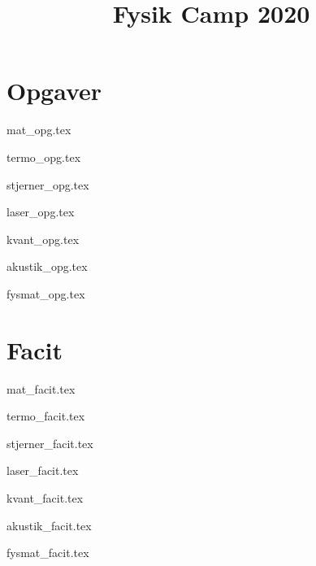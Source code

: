 \documentclass[a4paper]{memoir}
\title{Fysik Camp 2020}
\begin{document}


\newpage
\tableofcontents
\newpage
\mainmatter

\chapter{Opgaver}
{mat_opg.tex}

{termo_opg.tex}

{stjerner_opg.tex}

{laser_opg.tex}

{kvant_opg.tex}

{akustik_opg.tex}

{fysmat_opg.tex}

\setcounter{chapter}{0} %

\chapter{Facit}
{mat_facit.tex}

{termo_facit.tex}

{stjerner_facit.tex}

{laser_facit.tex}

{kvant_facit.tex}

{akustik_facit.tex}

{fysmat_facit.tex}
\end{document}
